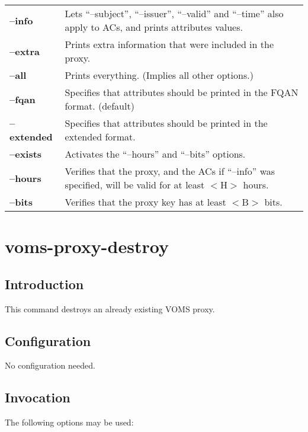 \documentclass[a4paper]{book}
\begin{document}
\begin{longtable}{lp{3in}}
\textbf{--info}     & Lets ``--subject'', ``--issuer'', ``--valid''
		      and ``--time'' also apply to ACs, and prints
		      attributes values.\\
\textbf{--extra}    & Prints extra information that were included in
		      the proxy.\\
\textbf{--all}      & Prints everything. (Implies all other
		      options.)\\
\textbf{--fqan}     & Specifies that attributes should be printed in
		      the FQAN format. (default)\\
\textbf{--extended} & Specifies that attributes should be printed in
		      the extended format.\\
\textbf{--exists}   & Activates the ``--hours'' and ``--bits''
		      options.\\
\textbf{--hours}    & Verifies that the proxy, and the ACs if
		      ``--info'' was specified, will be valid for at
		      least $<$H$>$ hours.\\
\textbf{--bits}     & Verifies that the proxy key has at least $<$B$>$
		      bits.\\
\end{longtable}


\chapter{voms-proxy-destroy}
\section{Introduction}
This command destroys an already existing VOMS proxy.

\section{Configuration}
No configuration needed.

\section{Invocation}
The following options may be used:
\end{document}
